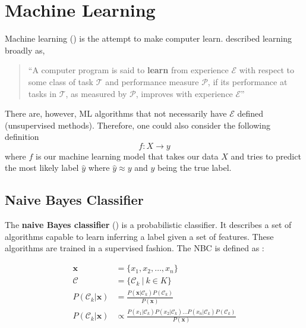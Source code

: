 \section{Machine Learning}
Machine learning () is the attempt to make computer learn. \citeauthor{Mitchell1997} described learning broadly as,
%
\begin{quote}
``A computer program is said to \textbf{learn} from experience $\mathcal{E}$ with respect to some class of task $\mathcal{T}$ and performance measure $\mathcal{P}$, if its performance at tasks in $\mathcal{T}$, as measured by $\mathcal{P}$, improves with experience $\mathcal{E}$''
\end{quote}
%
There are, however, ML algorithms that not necessarily have $\mathcal{E}$ defined (unsupervised methods). Therefore, one could also consider the following definition  \[f: X \rightarrow y\] where $f$ is our machine learning model that takes our data $X$ and tries to predict the most likely label $\hat{y}$ where $\hat{y} \approx y$ and $y$ being the true label.

\subsection{Naive Bayes Classifier}\label{section:nbc}
The \textbf{naive Bayes classifier} () is a probabilistic classifier. It describes a set of algorithms capable to learn inferring a label given a set of features. These algorithms are trained in a supervised fashion. The NBC is defined as :

\begin{align}
  \boldsymbol{x} &= \{x_1, x_2, \dots, x_n\} \\
  \mathcal{C} &= \{\mathcal{C}_k \: | \: k \in K \} \\
  P(\mathcal{C}_k|\boldsymbol{x}) &= \frac{P(\boldsymbol{x} |\mathcal{C}_k) P(\mathcal{C}_k)} {P(\boldsymbol{x})} \\
  P(\mathcal{C}_k|\boldsymbol{x}) &\propto \frac{P(x_1 |\mathcal{C}_k)
                                       P(x_2 |\mathcal{C}_k) \dots
                                       P(x_n |\mathcal{C}_k)
                                       P(\mathcal{C}_k)}{ P(\boldsymbol{x})}
\end{align}

